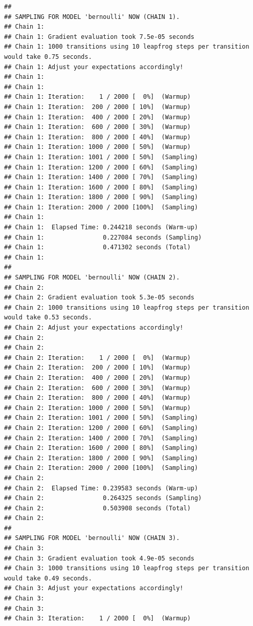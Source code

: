 \documentclass[
]{article}
\begin{document}
\begin{verbatim}
## 
## SAMPLING FOR MODEL 'bernoulli' NOW (CHAIN 1).
## Chain 1: 
## Chain 1: Gradient evaluation took 7.5e-05 seconds
## Chain 1: 1000 transitions using 10 leapfrog steps per transition would take 0.75 seconds.
## Chain 1: Adjust your expectations accordingly!
## Chain 1: 
## Chain 1: 
## Chain 1: Iteration:    1 / 2000 [  0%]  (Warmup)
## Chain 1: Iteration:  200 / 2000 [ 10%]  (Warmup)
## Chain 1: Iteration:  400 / 2000 [ 20%]  (Warmup)
## Chain 1: Iteration:  600 / 2000 [ 30%]  (Warmup)
## Chain 1: Iteration:  800 / 2000 [ 40%]  (Warmup)
## Chain 1: Iteration: 1000 / 2000 [ 50%]  (Warmup)
## Chain 1: Iteration: 1001 / 2000 [ 50%]  (Sampling)
## Chain 1: Iteration: 1200 / 2000 [ 60%]  (Sampling)
## Chain 1: Iteration: 1400 / 2000 [ 70%]  (Sampling)
## Chain 1: Iteration: 1600 / 2000 [ 80%]  (Sampling)
## Chain 1: Iteration: 1800 / 2000 [ 90%]  (Sampling)
## Chain 1: Iteration: 2000 / 2000 [100%]  (Sampling)
## Chain 1: 
## Chain 1:  Elapsed Time: 0.244218 seconds (Warm-up)
## Chain 1:                0.227084 seconds (Sampling)
## Chain 1:                0.471302 seconds (Total)
## Chain 1: 
## 
## SAMPLING FOR MODEL 'bernoulli' NOW (CHAIN 2).
## Chain 2: 
## Chain 2: Gradient evaluation took 5.3e-05 seconds
## Chain 2: 1000 transitions using 10 leapfrog steps per transition would take 0.53 seconds.
## Chain 2: Adjust your expectations accordingly!
## Chain 2: 
## Chain 2: 
## Chain 2: Iteration:    1 / 2000 [  0%]  (Warmup)
## Chain 2: Iteration:  200 / 2000 [ 10%]  (Warmup)
## Chain 2: Iteration:  400 / 2000 [ 20%]  (Warmup)
## Chain 2: Iteration:  600 / 2000 [ 30%]  (Warmup)
## Chain 2: Iteration:  800 / 2000 [ 40%]  (Warmup)
## Chain 2: Iteration: 1000 / 2000 [ 50%]  (Warmup)
## Chain 2: Iteration: 1001 / 2000 [ 50%]  (Sampling)
## Chain 2: Iteration: 1200 / 2000 [ 60%]  (Sampling)
## Chain 2: Iteration: 1400 / 2000 [ 70%]  (Sampling)
## Chain 2: Iteration: 1600 / 2000 [ 80%]  (Sampling)
## Chain 2: Iteration: 1800 / 2000 [ 90%]  (Sampling)
## Chain 2: Iteration: 2000 / 2000 [100%]  (Sampling)
## Chain 2: 
## Chain 2:  Elapsed Time: 0.239583 seconds (Warm-up)
## Chain 2:                0.264325 seconds (Sampling)
## Chain 2:                0.503908 seconds (Total)
## Chain 2: 
## 
## SAMPLING FOR MODEL 'bernoulli' NOW (CHAIN 3).
## Chain 3: 
## Chain 3: Gradient evaluation took 4.9e-05 seconds
## Chain 3: 1000 transitions using 10 leapfrog steps per transition would take 0.49 seconds.
## Chain 3: Adjust your expectations accordingly!
## Chain 3: 
## Chain 3: 
## Chain 3: Iteration:    1 / 2000 [  0%]  (Warmup)

\end{verbatim}
\end{document}
